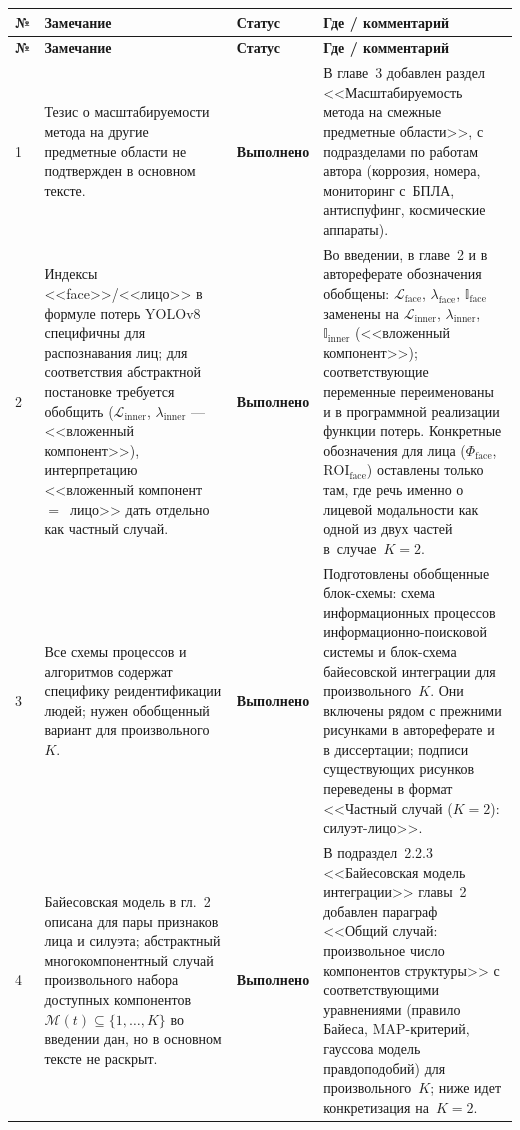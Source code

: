 \documentclass[a4paper,11pt]{article}
\newcommand{\statusDone}{{\color{statusDone}\textbf{Выполнено}}}
\begin{document}
\begin{longtable}{@{}p{}p{}p{}p{}@{}}
\toprule
\textbf{№} & \textbf{Замечание} & \textbf{Статус} & \textbf{Где / комментарий}\\
\midrule
\endfirsthead
\toprule
\textbf{№} & \textbf{Замечание} & \textbf{Статус} & \textbf{Где / комментарий}\\
\midrule
\endhead
\bottomrule
\endfoot

1 & Тезис о масштабируемости метода на другие предметные области не подтвержден в основном тексте.
& \statusDone
& В главе~3 добавлен раздел <<Масштабируемость метода на смежные предметные области>>, с подразделами по работам автора (коррозия, номера, мониторинг с~БПЛА, антиспуфинг, космические аппараты).\\
\midrule

2 & Индексы <<face>>/<<лицо>> в формуле потерь YOLOv8 специфичны для распознавания лиц; для соответствия абстрактной постановке требуется обобщить ($\mathcal{L}_{\text{inner}}$, $\lambda_{\text{inner}}$ — <<вложенный компонент>>), интерпретацию <<вложенный компонент~$=$~лицо>> дать отдельно как частный случай.
& \statusDone
& Во введении, в главе~2 и в автореферате обозначения обобщены: $\mathcal{L}_{\text{face}}$, $\lambda_{\text{face}}$, $\mathbb{I}_{\text{face}}$ заменены на $\mathcal{L}_{\text{inner}}$, $\lambda_{\text{inner}}$, $\mathbb{I}_{\text{inner}}$ (<<вложенный компонент>>); соответствующие переменные переименованы и в программной реализации функции потерь. Конкретные обозначения для лица ($\Phi_{\text{face}}$, $\mathrm{ROI}_{\text{face}}$) оставлены только там, где речь именно о лицевой модальности как одной из двух частей в~случае~$K=2$.\\
\midrule

3 & Все схемы процессов и алгоритмов содержат специфику реидентификации людей; нужен обобщенный вариант для произвольного $K$.
& \statusDone
& Подготовлены обобщенные блок-схемы: схема информационных процессов информационно-поисковой системы и блок-схема байесовской интеграции для произвольного~$K$. Они включены рядом с прежними рисунками в автореферате и в диссертации; подписи существующих рисунков переведены в формат <<Частный случай ($K=2$): силуэт-лицо>>.\\
\midrule

4 & Байесовская модель в гл.~2 описана для пары признаков лица и силуэта; абстрактный многокомпонентный случай произвольного набора доступных компонентов $\mathcal{M}(t)\subseteq\{1,\ldots,K\}$ во введении дан, но в основном тексте не раскрыт.
& \statusDone
& В подраздел~2.2.3 <<Байесовская модель интеграции>> главы~2 добавлен параграф <<Общий случай: произвольное число компонентов структуры>> с соответствующими уравнениями (правило Байеса, MAP-критерий, гауссова модель правдоподобий) для произвольного~$K$; ниже идет конкретизация на~$K=2$.\\
\midrule


\end{longtable}
\end{document}
